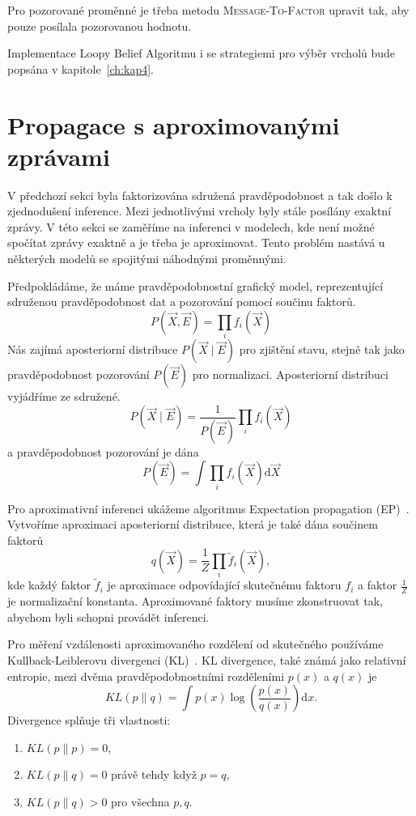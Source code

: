Pro pozorované proměnné je třeba metodu \textsc{Message-To-Factor} upravit tak, aby pouze posílala pozorovanou hodnotu.

Implementace Loopy Belief Algoritmu i se strategiemi pro výběr vrcholů bude popsána v kapitole~\ref{ch:kap4}.

\section{Propagace s aproximovanými zprávami}

V předchozí sekci byla faktorizována sdružená pravděpodobnost a tak došlo k zjednodušení inference.
Mezi jednotlivými vrcholy byly stále posílány exaktní zprávy.
V této sekci se zaměříme na inferenci v modelech, kde není možné spočítat zprávy exaktně a je třeba je aproximovat.
Tento problém nastává u některých modelů se spojitými náhodnými proměnnými.

Předpokládáme, že máme pravděpodobnostní grafický model, reprezentující sdruženou pravděpodobnost dat a pozorování pomocí součinu faktorů.
\begin{equation}
P(\vec{X}, \vec{E}) = \prod_i f_i(\vec{X})
\end{equation}
Nás zajímá aposteriorní distribuce $P(\vec{X} \mid \vec{E})$ pro zjištění stavu, stejně tak jako pravděpodobnost pozorování $P(\vec{E})$ pro normalizaci.
Aposteriorní distribuci vyjádříme ze sdružené.
\begin{equation}
P(\vec{X} \mid \vec{E}) = \frac{1}{P(\vec{E})} \prod_i f_i(\vec{X})
\end{equation}
a pravděpodobnost pozorování je dána
\begin{equation}
P(\vec{E}) = \int \prod_i f_i(\vec{X}) \mathrm{d}\vec{X}
\end{equation}

Pro aproximativní inferenci ukážeme algoritmus Expectation propagation (EP)~\cite{minka2001expectation}.
Vytvoříme aproximaci aposteriorní distribuce, která je také dána součinem faktorů
\begin{equation}
q(\vec{X}) = \frac{1}{Z} \prod_i \tilde{f}_i(\vec{X}),
\end{equation}
kde každý faktor $\tilde{f}_i$ je aproximace odpovídající skutečnému faktoru $f_i$ a faktor $\frac{1}{Z}$ je normalizační konstanta.
Aproximované faktory musíme zkonstruovat tak, abychom byli schopni provádět inferenci.

Pro měření vzdálenosti aproximovaného rozdělení od skutečného používáme Kullback-Leiblerovu divergenci (KL)~\cite{kullback1997information}.
KL divergence, také známá jako relativní entropie, mezi dvěma pravděpodobnostními rozděleními $p(x)$ a $q(x)$ je
\begin{equation}
KL(p \| q) = \int p(x) \log \left(\frac{p(x)}{q(x)}\right) \mathrm{d}x.
\end{equation}
Divergence splňuje tři vlastnosti:
\begin{enumerate}
\item $KL(p \| p) = 0$,
\item $KL(p \| q) = 0$ právě tehdy když $p = q$,
\item $KL(p \| q) > 0$ pro všechna $p, q$.
\end{enumerate}

